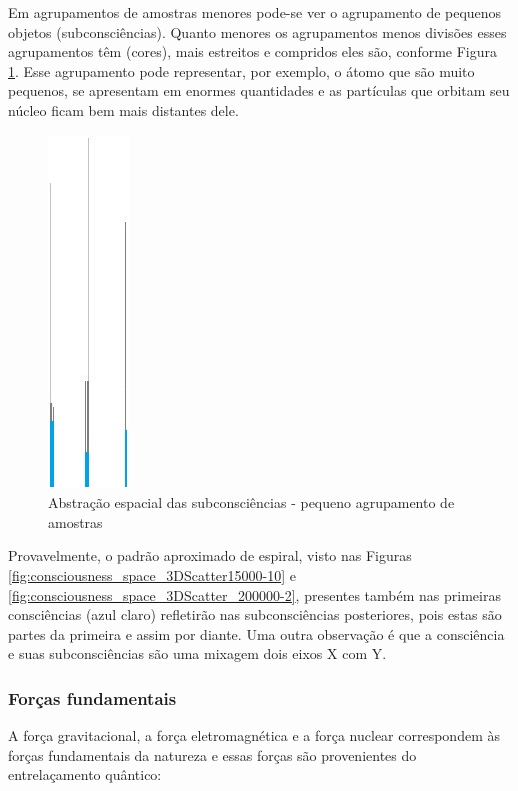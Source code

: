 Em agrupamentos de amostras menores pode-se ver o agrupamento de pequenos objetos (subconsciências). Quanto menores os agrupamentos menos divisões esses agrupamentos têm (cores), mais estreitos e compridos eles são, conforme Figura \ref{fig:consciousness_space_subconsciousness_min}. Esse agrupamento pode representar, por exemplo, o átomo que são muito pequenos, se apresentam em enormes quantidades e as partículas que orbitam seu núcleo ficam bem mais distantes dele.
\begin{figure}[H]
\caption{Abstração espacial das subconsciências - pequeno agrupamento de amostras}
\label{fig:consciousness_space_subconsciousness_min}
\centering
\includegraphics[scale=.9]{sections/images/consciousness_space_subconsciousness_min.jpg}
\end{figure}

Provavelmente, o padrão aproximado de espiral, visto nas Figuras \ref{fig:consciousness_space_3DScatter15000-10} e \ref{fig:consciousness_space_3DScatter_200000-2}, presentes também nas primeiras consciências (azul claro) refletirão nas subconsciências posteriores, pois estas são partes da primeira e assim por diante. Uma outra observação é que a consciência e suas subconsciências são uma mixagem dois eixos X com Y.

\subsubsection{Forças fundamentais}
A força gravitacional, a força eletromagnética e a força nuclear correspondem às forças fundamentais da natureza e essas forças são provenientes do entrelaçamento quântico:

